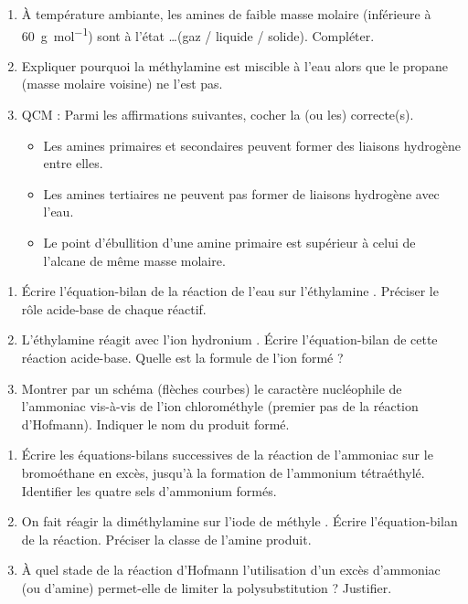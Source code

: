 \documentclass[11pt]{article}
\begin{document}
\begin{exercice}
\begin{enumerate}
    \item À température ambiante, les amines de faible masse molaire (inférieure à \SI{60}{g.mol^{-1}}) sont à l'état \ldots (gaz / liquide / solide). Compléter.
    \item Expliquer pourquoi la méthylamine  est miscible à l'eau alors que le propane  (masse molaire voisine) ne l'est pas.
    \item QCM : Parmi les affirmations suivantes, cocher la (ou les) correcte(s).
    \begin{itemize}
        \item[$\square$] Les amines primaires et secondaires peuvent former des liaisons hydrogène entre elles.
        \item[$\square$] Les amines tertiaires ne peuvent pas former de liaisons hydrogène avec l'eau.
        \item[$\square$] Le point d'ébullition d'une amine primaire est supérieur à celui de l'alcane de même masse molaire.
    \end{itemize}
\end{enumerate}
\end{exercice}

\begin{exercice}
\begin{enumerate}
    \item Écrire l'équation-bilan de la réaction de l'eau sur l'éthylamine . Préciser le rôle acide-base de chaque réactif.
    \item L'éthylamine réagit avec l'ion hydronium . Écrire l'équation-bilan de cette réaction acide-base. Quelle est la formule de l'ion formé ?
    \item Montrer par un schéma (flèches courbes) le caractère nucléophile de l'ammoniac  vis-à-vis de l'ion chlorométhyle  (premier pas de la réaction d'Hofmann). Indiquer le nom du produit formé.
\end{enumerate}
\end{exercice}

\begin{exercice}
\begin{enumerate}
    \item Écrire les équations-bilans successives de la réaction de l'ammoniac  sur le bromoéthane  en excès, jusqu'à la formation de l'ammonium tétraéthylé. Identifier les quatre sels d'ammonium formés.
    \item On fait réagir la diméthylamine  sur l'iode de méthyle . Écrire l'équation-bilan de la réaction. Préciser la classe de l'amine produit.
    \item À quel stade de la réaction d'Hofmann l'utilisation d'un excès d'ammoniac (ou d'amine) permet-elle de limiter la polysubstitution ? Justifier.
\end{enumerate}
\end{exercice}
\end{document}

